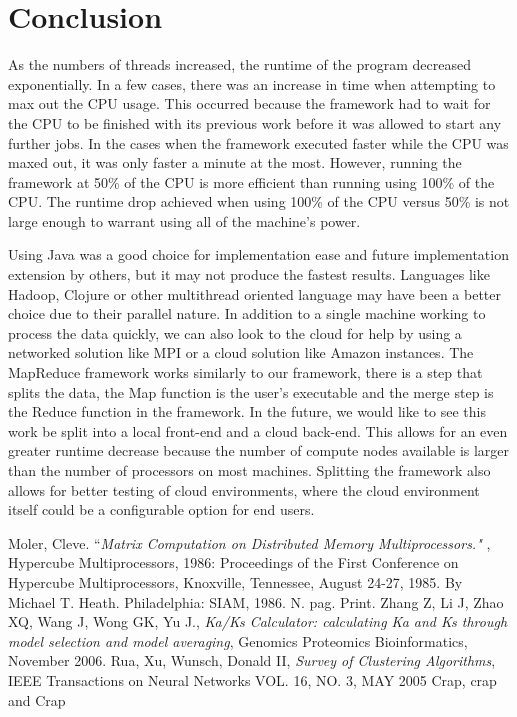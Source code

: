 \documentclass[12pt]{article}
\begin{document}
\section{Conclusion}

As the numbers of threads increased, the runtime of the program decreased 
exponentially. In a few cases, there was an increase in time when attempting to 
max out the CPU usage. This occurred because the framework had to wait for the 
CPU to be finished with its previous work before it was allowed to start any 
further jobs. In the cases when the framework executed faster while the CPU was 
maxed out, it was only faster a minute at the most. However, running the 
framework at 50\% of the CPU is more efficient than running using 100\% of the 
CPU. The runtime drop achieved when using 100\% of the CPU versus 50\% is not 
large enough to warrant using all of the machine's power.

Using Java was a good choice for implementation ease and future implementation
extension by others, but it may not produce the fastest results. Languages
like Hadoop, Clojure or other multithread oriented language may have been a
better choice due to their parallel nature. In addition to a single machine 
working to process the data quickly, we can also look to the cloud for help by 
using a networked solution like MPI or a cloud solution like Amazon instances. 
The MapReduce framework works similarly to our framework, there is a step that
splits the data, the Map function is the user's executable and the merge step is
the Reduce function in the framework. In the future, we would like to see this 
work be split into a local front-end and a cloud back-end. This allows for an 
even greater runtime decrease because the number of compute nodes available is 
larger than the number of processors on most machines. Splitting the framework 
also allows for better testing of cloud environments, where the cloud 
environment itself could be a configurable option for end users.

\begin{thebibliography}{1}
Moler, Cleve. ``\emph{Matrix Computation on Distributed Memory Multiprocessors."
}, Hypercube Multiprocessors, 1986: Proceedings of the First Conference on
Hypercube Multiprocessors, Knoxville, Tennessee, August 24-27, 1985. By Michael
T. Heath. Philadelphia: SIAM, 1986. N. pag. Print.
Zhang Z, Li J, Zhao XQ, Wang J, Wong GK, Yu J., \emph{Ka/Ks Calculator: 
calculating Ka and Ks through model selection and model averaging},
Genomics Proteomics Bioinformatics, November 2006.
Rua, Xu, Wunsch, Donald II, \emph{Survey of Clustering Algorithms},
IEEE Transactions on Neural Networks VOL. 16, NO. 3, MAY 2005
Crap, crap and Crap
\end{thebibliography}
\end{document}
